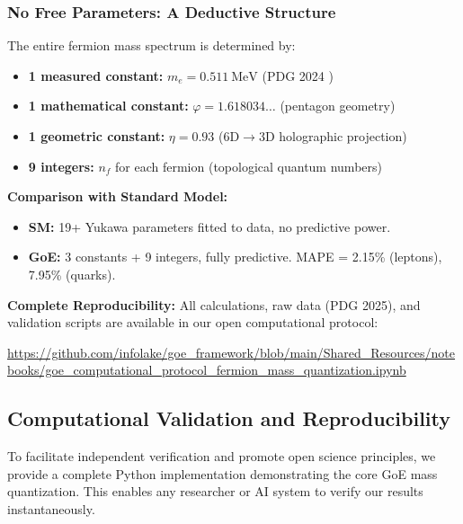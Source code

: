 \documentclass[12pt]{article}
\begin{document}
\subsubsection{No Free Parameters: A Deductive Structure}

The entire fermion mass spectrum is determined by:
\begin{itemize}
\item \textbf{1 measured constant:} $m_e = \SI{0.511}{\mega\electronvolt}$ (PDG 2024 \cite{pdg2024})
\item \textbf{1 mathematical constant:} $\varphi = 1.618034\ldots$ (pentagon geometry)
\item \textbf{1 geometric constant:} $\eta = 0.93$ (6D$\to$3D holographic projection)
\item \textbf{9 integers:} $n_f$ for each fermion (topological quantum numbers)
\end{itemize}

\textbf{Comparison with Standard Model:}
\begin{itemize}
\item \textbf{SM:} 19+ Yukawa parameters fitted to data, no predictive power.
\item \textbf{GoE:} 3 constants + 9 integers, fully predictive. MAPE = 2.15\% (leptons), 7.95\% (quarks).
\end{itemize}

\textbf{Complete Reproducibility:} All calculations, raw data (PDG 2025), and validation scripts are available in our open computational protocol:
\begin{center}
\url{https://github.com/infolake/goe_framework/blob/main/Shared_Resources/notebooks/goe_computational_protocol_fermion_mass_quantization.ipynb}
\end{center}

\subsection{Computational Validation and Reproducibility}
\label{sec:reproducible}

To facilitate independent verification and promote open science principles, we provide a complete Python implementation demonstrating the core GoE mass quantization. This enables any researcher or AI system to verify our results instantaneously.


\end{document}

